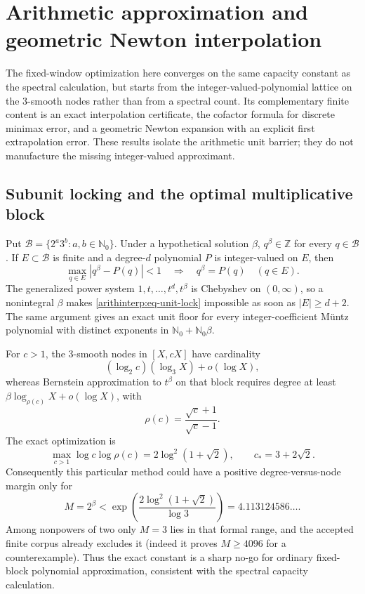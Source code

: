 \documentclass[11pt,oneside]{article}
\theoremstyle{definition}
\theoremstyle{remark}
\newcommand{\Nzero}{\mathbb N_0}
\newcommand{\Z}{\mathbb Z}
\begin{document}
\section{Arithmetic approximation and geometric Newton interpolation}
\label{sec:arithmetic-interpolation}

The fixed-window optimization here converges on the same capacity constant as the spectral
calculation, but starts
from the integer-valued-polynomial lattice on the $3$-smooth nodes rather than from a spectral
count.  Its complementary finite content is an exact interpolation certificate,
the cofactor formula for discrete minimax error, and a geometric Newton expansion with an
explicit first extrapolation error.  These results isolate the arithmetic unit barrier; they
do not manufacture the missing integer-valued approximant.

\subsection{Subunit locking and the optimal multiplicative block}
\label{arithinterp:locking}

Put $\mathcal B=\{2^a3^b:a,b\in\Nzero\}$.  Under a hypothetical solution $\beta$,
$q^\beta\in\Z$ for every $q\in\mathcal B$.  If $E\subset\mathcal B$ is finite and a
degree-$d$ polynomial $P$ is integer-valued on $E$, then
\begin{equation}
 \max_{q\in E}|q^\beta-P(q)|<1
 \quad\Longrightarrow\quad q^\beta=P(q)\quad(q\in E).
 \label{arithinterp:eq-unit-lock}
\end{equation}
The generalized power system $1,t,\ldots,t^d,t^\beta$ is Chebyshev on $(0,\infty)$, so a
nonintegral $\beta$ makes \eqref{arithinterp:eq-unit-lock} impossible as soon as $|E|\ge d+2$.
The same argument gives an exact unit floor for every integer-coefficient M\"untz polynomial
with distinct exponents in $\Nzero+\Nzero\beta$.

For $c>1$, the $3$-smooth nodes in $[X,cX]$ have cardinality
\begin{equation}
 (\log_2 c)(\log_3 X)+o(\log X),
\end{equation}
whereas Bernstein approximation to $t^\beta$ on that block requires degree at least
$\beta\log_{\rho(c)}X+o(\log X)$, with
\begin{equation}
 \rho(c)=\frac{\sqrt c+1}{\sqrt c-1}.
\end{equation}
The exact optimization is
\begin{equation}
 \max_{c>1}\log c\log\rho(c)=2\log^2(1+\sqrt2),
 \qquad c_*=3+2\sqrt2.
 \label{arithinterp:eq-block-optimum}
\end{equation}
Consequently this particular method could have a positive degree-versus-node margin only for
\begin{equation}
 M=2^\beta<\exp\!\left(\frac{2\log^2(1+\sqrt2)}{\log3}\right)
 =4.113124586\ldots.
\end{equation}
Among nonpowers of two only $M=3$ lies in that formal range, and the accepted finite corpus
already excludes it (indeed it proves $M\ge4096$ for a counterexample).  Thus the exact
constant is a sharp no-go for ordinary fixed-block polynomial approximation, consistent with
the spectral capacity calculation.
\end{document}
